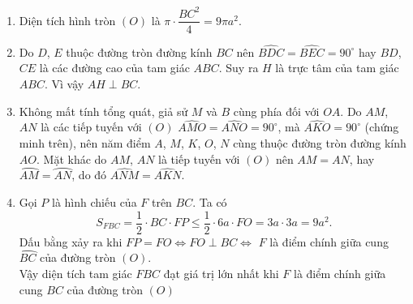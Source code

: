 \begin{ex}
{\begin{center}
\end{center}
\begin{enumerate}
\item Diện tích hình tròn $(O)$ là $\pi \cdot \dfrac{BC^2}{4}=9\pi a^2$.
\item Do $D$, $E$ thuộc đường tròn đường kính $BC$ nên $\widehat{BDC}=\widehat{BEC}=90^\circ$ hay $BD$, $CE$ là các đường cao của tam giác $ABC$. Suy ra $H$ là trực tâm của tam giác $ABC$. Vì vậy $AH\perp BC$.
\item Không mất tính tổng quát, giả sử $M$ và $B$ cùng phía đối với $OA$. Do $AM$, $AN$ là các tiếp tuyến với $(O)$ $\widehat{AMO}=\widehat{ANO}=90^\circ$, mà $\widehat{AKO}=90^\circ$ (chứng minh trên), nên năm điểm $A$, $M$, $K$, $O$, $N$ cùng thuộc đường tròn đường kính $AO$. Mặt khác do $AM$, $AN$ là tiếp tuyến với $(O)$ nên $AM=AN$, hay $\wideparen{AM}=\wideparen{AN}$, do đó $\widehat{ANM}=\widehat{AKN}$.
\item Gọi $P$ là hình chiếu của $F$ trên $BC$. Ta có
\[S_{FBC}=\dfrac{1}{2}\cdot BC\cdot FP\le \dfrac{1}{2}\cdot 6a\cdot FO=3a\cdot 3a=9a^2.\]
Dấu bằng xảy ra khi $FP=FO \Leftrightarrow FO\perp BC \Leftrightarrow$ $F$ là điểm chính giữa cung $\wideparen{BC}$ của đường tròn $(O)$.\\
Vậy diện tích tam giác $FBC$ đạt giá trị lớn nhất khi $F$ là điểm chính giữa cung $BC$ của đường tròn $(O)$
\end{enumerate}
}
\end{ex}

